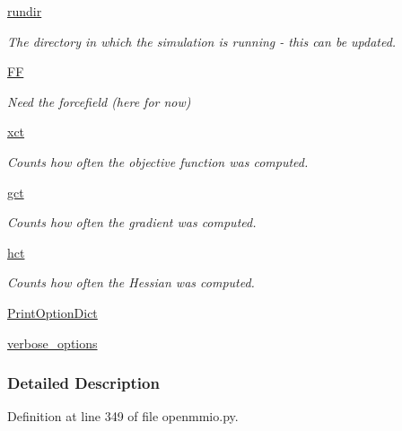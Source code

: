\begin{DoxyCompactItemize}
\hyperlink{classforcebalance_1_1target_1_1Target_a6872de5b2d4273b82336ea5b0da29c9e}{rundir}
\begin{DoxyCompactList}\small\item\em The directory in which the simulation is running -\/ this can be updated. \end{DoxyCompactList}\item 
\hyperlink{classforcebalance_1_1target_1_1Target_a38a37919783141ea37fdcf8b00ce0aaf}{F\-F}
\begin{DoxyCompactList}\small\item\em Need the forcefield (here for now) \end{DoxyCompactList}\item 
\hyperlink{classforcebalance_1_1target_1_1Target_aad2e385cfbf7b4a68f1c2cb41133fe82}{xct}
\begin{DoxyCompactList}\small\item\em Counts how often the objective function was computed. \end{DoxyCompactList}\item 
\hyperlink{classforcebalance_1_1target_1_1Target_aa625ac88c6744eb14ef281d9496d0dbb}{gct}
\begin{DoxyCompactList}\small\item\em Counts how often the gradient was computed. \end{DoxyCompactList}\item 
\hyperlink{classforcebalance_1_1target_1_1Target_a5b5a42f78052b47f29ed4b940c6111a1}{hct}
\begin{DoxyCompactList}\small\item\em Counts how often the Hessian was computed. \end{DoxyCompactList}\item 
\hyperlink{classforcebalance_1_1BaseClass_afc6659278497d7245bc492ecf405ccae}{Print\-Option\-Dict}
\item 
\hyperlink{classforcebalance_1_1BaseClass_afd68efa29ccd2f320f4cf82198214aac}{verbose\-\_\-options}
\end{DoxyCompactItemize}


\subsubsection{Detailed Description}


Definition at line 349 of file openmmio.\-py.



